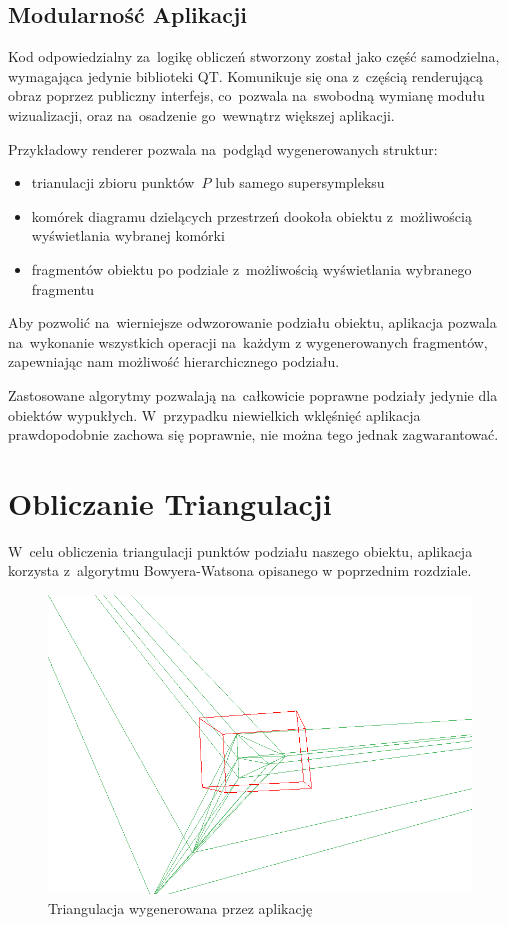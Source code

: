 \documentclass[skorowidz,autorrok,backref,xodstep,oswiadczenie]{wmimgr}
\begin{document}
\subsection{Modularność Aplikacji}

Kod odpowiedzialny za~logikę obliczeń stworzony został jako część samodzielna, wymagająca jedynie biblioteki QT. Komunikuje się ona z~częścią renderującą obraz poprzez publiczny interfejs, co~pozwala na~swobodną wymianę modułu wizualizacji, oraz na~osadzenie go~wewnątrz większej aplikacji.

Przykładowy renderer pozwala na~podgląd wygenerowanych struktur:
\begin{itemize}
\item
trianulacji zbioru punktów~$P$ lub samego supersympleksu
\item
komórek diagramu dzielących przestrzeń dookoła obiektu z~możliwością wyświetlania wybranej komórki
\item
fragmentów obiektu po podziale z~możliwością wyświetlania wybranego fragmentu
\end{itemize}

Aby pozwolić na~wierniejsze odwzorowanie podziału obiektu, aplikacja pozwala na~wykonanie wszystkich operacji na~każdym z wygenerowanych fragmentów, zapewniając nam możliwość hierarchicznego podziału.

Zastosowane algorytmy pozwalają na~całkowicie poprawne podziały jedynie dla obiektów wypukłych. W~przypadku niewielkich wklęśnięć aplikacja prawdopodobnie zachowa się poprawnie, nie można tego jednak zagwarantować.

\section{Obliczanie Triangulacji}

W~celu obliczenia triangulacji punktów podziału naszego obiektu, aplikacja korzysta z~algorytmu Bowyera-Watsona opisanego w poprzednim rozdziale.

\begin{figure}[ht!]
\centering
\includegraphics[width=140mm]{images/app1_1.png}
\caption{Triangulacja wygenerowana przez aplikację}
\label{apptriangulation}
\end{figure}
\end{document}

